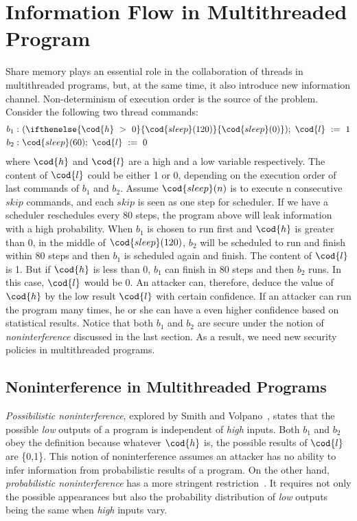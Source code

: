 
\section{Information Flow in Multithreaded Program}
Share memory plays an essential role in the collaboration of 
threads in multithreaded programs, but, at the same time, it also
introduce new information channel. Non-determinism of execution
order is the source of the problem. Consider the following
two thread commands:
\begin{align*}
b_1:&~(\ifthenelse{\cod{h}~>~0}{\cod{sleep}(120)}{\cod{sleep}(0)});~\cod{l}~:=~1 \\
b_2:&~\cod{sleep}(60);~\cod{l}~:=~0
\end{align*}
where $\cod{h}$ and $\cod{l}$ are a high and a low variable 
respectively. The content of $\cod{l}$ could be either 1 or 0,
depending on the execution order of last commands of $b_1$ and $b_2$.
Assume $\cod{sleep}(n)$ is to execute n consecutive $skip$ commands, and 
each $skip$ is seen as one step for scheduler. If we have a scheduler 
reschedules every 80 steps, the program above will leak information
with a high probability. When $b_1$ is chosen to run first and $\cod{h}$
is greater than 0, in the middle of $\cod{sleep}(120)$, $b_2$ will be
scheduled to run and finish within 80 steps and then $b_1$ is scheduled
again and finish. The content of $\cod{l}$ is 1. But if $\cod{h}$ is less
than 0, $b_1$ can finish in 80 steps and then $b_2$ runs. In this case,
$\cod{l}$ would be 0. An attacker can, therefore, deduce the value of $\cod{h}$ 
by the low result $\cod{l}$ with certain confidence. If an attacker can
run the program many times, he or she can have a even higher confidence 
based on statistical results. Notice that both $b_1$ and $b_2$ are secure
under the notion of {\it noninterference} discussed in the last section.
As a result, we need new security policies in multithreaded programs.

\subsection{Noninterference in Multithreaded Programs}
{\em Possibilistic noninterference}, explored by Smith and 
Volpano~\cite{Smith:Volpano:MultiThreaded}, states that the possible 
{\it low} outputs of a program is independent of {\it high} inputs. 
Both $b_1$ and $b_2$ obey the definition because whatever $\cod{h}$ is, 
the possible results of $\cod{l}$ are \{0,1\}. This notion of 
noninterference assumes an attacker has no ability to infer information
from probabilistic results of a program. On the other hand, 
{\em probabilistic noninterference} has a more stringent 
restriction~\cite{Volpano:Smith:Probabilistic}. It requires not only the 
possible appearances but also the probability distribution of {\it low} outputs
being the same when {\it high} inputs vary. 

